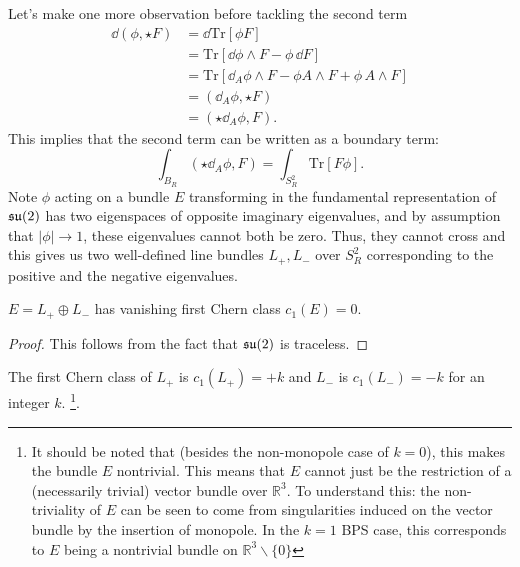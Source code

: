 	
	Let's make one more observation before tackling the second term
	\begin{equation}
		\begin{aligned}
			\dd(\phi, \star F) &= \dd \mathrm{Tr}[\phi F]\\
			&= \mathrm{Tr}[\dd\phi \wedge F - \phi\, \dd F]\\
			& = \mathrm{Tr}[\dd_A \phi \wedge F - \phi A \wedge F + \phi\, A \wedge F] \\
			&= (\dd_A \phi, \star F)\\
			&= (\star \dd_A \phi, F).
		\end{aligned}
	\end{equation}	
	This implies that the second term can be written as a boundary term:
	\begin{equation*}
		\int_{B_R} (\star \dd_A \phi, F) = \int_{S^2_R} \mathrm{Tr}[F \phi].
	\end{equation*}
	Note $\phi$ acting on a bundle $E$ transforming in the fundamental representation of $\frak{su}(2)$ has two eigenspaces of opposite imaginary eigenvalues, and by assumption that $|\phi|\to 1$, these eigenvalues cannot both be zero. Thus, they cannot cross and this gives us two well-defined line bundles $L_+, L_-$ over $S^2_R$ corresponding to the positive and the negative eigenvalues.
	\begin{prop}
		$E = L_+ \oplus L_-$ has vanishing first Chern class $c_1(E) = 0$.
	\end{prop}
	\begin{proof}
		This follows from the fact that $\frak{su}(2)$ is traceless.
	\end{proof}
	\begin{cor}
		The first Chern class of $L_+$ is $c_1(L_+) = +k$ and $L_-$ is $c_1(L_-) = -k$ for an integer $k$.
		\footnote{It should be noted that (besides the non-monopole case of $k = 0$), this makes the bundle $E$ nontrivial. This means that $E$ cannot just be the restriction of a (necessarily trivial) vector bundle over $\mathbb R^3$. To understand this: the non-triviality of $E$ can be seen to come from singularities induced on the vector bundle by the insertion of monopole. In the $k=1$ BPS case, this corresponds to $E$ being a nontrivial bundle on $\mathbb R^3 \backslash \{0\}$}.
	\end{cor}

